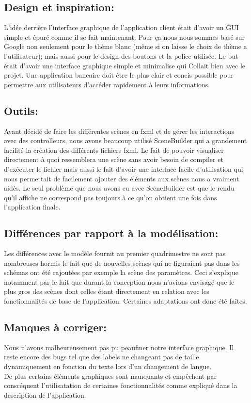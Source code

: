 \documentclass[../rapport.tex]{subfiles}
\begin{document}
\subsection{Design et inspiration:}
    
    L'idée derrière l'interface graphique de l'application client était d'avoir un GUI simple et épuré comme il se fait maintenant.
    Pour ça nous nous sommes basé sur Google non seulement pour le thème blanc (même si on laisse le choix de thème a l'utilisateur);
    mais aussi pour le design des boutons et la police utilisée. Le but était d'avoir une interface graphique simple et minimalise qui 
    Collait bien avec le projet. Une application bancaire doit être le plus clair et concis possible pour permettre aux utilisateurs d'accéder
    rapidement à leurs informations.

\subsection{Outils:}

    Ayant décidé de faire les différentes scènes en fxml et de gérer les interactions avec des controlleurs, nous avons beaucoup utilisé 
    SceneBuilder qui a grandement facilité la création des différents fichiers fxml. Le fait de pouvoir visualiser directement à quoi ressemblera
    une scène sans avoir besoin de compiler et d'exécuter le fichier mais aussi le fait d'avoir une interface facile d'utilisation qui nous 
    permettait de facilement ajouter des éléments aux scènes nous a vraiment aidés. Le seul problème que nous avons eu avec SceneBuilder est que
    le rendu qu'il affiche ne correspond pas toujours à ce qu'on obtient une fois dans l'application finale.

\subsection{Différences par rapport à la modélisation:}

    Les différences avec le modèle fournit au premier quadrimestre ne sont pas nombreuses hormis le fait que de nouvelles scènes qui 
    ne figuraient pas dans les schémas ont été rajoutées par exemple la scène des paramètres. Ceci s'explique notamment par le fait que 
    durant la conception nous n'avions envisagé que le plus gros des scènes dont celles étant directement en relation avec les fonctionnalités de base
    de l'application. Certaines adaptations ont donc été faites.


\subsection{Manques à corriger:}
    Nous n'avons malheureusement pas pu peaufiner notre interface graphique. Il reste encore des bugs 
    tel que  des labels ne changeant pas de taille dynamiquement en fonction du texte lors d'un changement de langue.\\
    De plus certains éléments graphiques sont manquants et empêchent par conscéquent l'utilisatation de certaines fonctionnalités comme expliqué dans la description de l'application.
    \newpage
\end{document}
